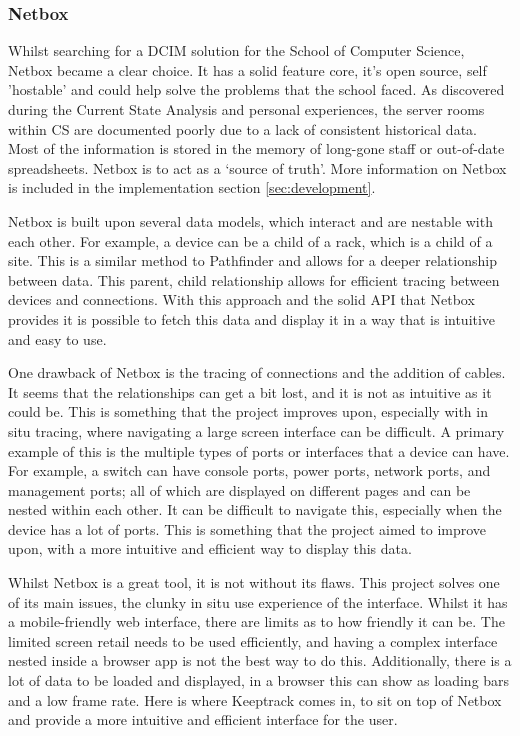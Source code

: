 \documentclass [11pt,a4paper]{article}
\begin{document}
\pagebreak

\subsubsection{Netbox}
\label{sec:netbox}
Whilst searching for a DCIM solution for the School of Computer Science, Netbox became a clear choice. It has a solid feature core, it's open source, self 'hostable' and could help solve the problems that the school faced. As discovered during the Current State Analysis and personal experiences, the server rooms within CS are documented poorly due to a lack of consistent historical data. Most of the information is stored in the memory of long-gone staff or out-of-date spreadsheets. Netbox is to act as a `source of truth'\cite{Netbox}. More information on Netbox is included in the implementation section \ref{sec:development}. 

Netbox is built upon several data models, which interact and are nestable with each other. For example, a device can be a child of a rack, which is a child of a site. This is a similar method to Pathfinder and allows for a deeper relationship between data. This parent, child relationship allows for efficient tracing between devices and connections. With this approach and the solid API that Netbox provides it is possible to fetch this data and display it in a way that is intuitive and easy to use. 

One drawback of Netbox is the tracing of connections and the addition of cables. It seems that the relationships can get a bit lost, and it is not as intuitive as it could be. This is something that the project improves upon, especially with in situ tracing, where navigating a large screen interface can be difficult. A primary example of this is the multiple types of ports or interfaces that a device can have. For example, a switch can have console ports, power ports,  network ports, and management ports; all of which are displayed on different pages and can be nested within each other. It can be difficult to navigate this, especially when the device has a lot of ports. This is something that the project aimed to improve upon, with a more intuitive and efficient way to display this data.

Whilst Netbox is a great tool, it is not without its flaws. This project solves one of its main issues, the clunky in situ use experience of the interface. Whilst it has a mobile-friendly web interface, there are limits as to how friendly it can be. The limited screen retail needs to be used efficiently, and having a complex interface nested inside a browser app is not the best way to do this. Additionally, there is a lot of data to be loaded and displayed, in a browser this can show as loading bars and a low frame rate. Here is where Keeptrack comes in, to sit on top of Netbox and provide a more intuitive and efficient interface for the user.  
\end{document}
